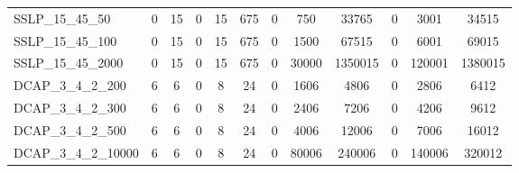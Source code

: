 \begin{table}[H]
\begin{tabular}{|l|ccc|ccc|ccccc|}
			SSLP\_15\_45\_50               & 0         & 15       & 0       & 15            & 675          & 0            & 750   & 33765   & 0   & 3001   & 34515   \\
			SSLP\_15\_45\_100              & 0         & 15       & 0       & 15            & 675          & 0            & 1500  & 67515   & 0   & 6001   & 69015   \\
			SSLP\_15\_45\_2000             & 0         & 15       & 0       & 15            & 675          & 0            & 30000 & 1350015 & 0   & 120001 & 1380015 \\
			DCAP\_3\_4\_2\_200             & 6         & 6        & 0       & 8             & 24           & 0            & 1606  & 4806    & 0   & 2806   & 6412    \\
			DCAP\_3\_4\_2\_300             & 6         & 6        & 0       & 8             & 24           & 0            & 2406  & 7206    & 0   & 4206   & 9612    \\
			DCAP\_3\_4\_2\_500             & 6         & 6        & 0       & 8             & 24           & 0            & 4006  & 12006   & 0   & 7006   & 16012   \\
			DCAP\_3\_4\_2\_10000           & 6         & 6        & 0       & 8             & 24           & 0            & 80006 & 240006  & 0   & 140006 & 320012  \\ \hline
		\end{tabular}
\end{table}

